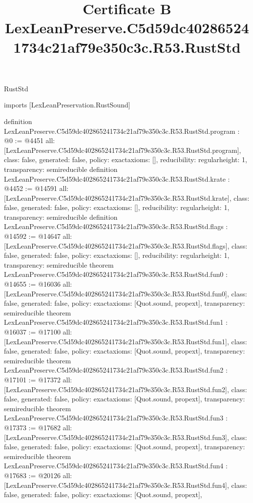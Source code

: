 \begin{lexlean}{RustStd}
\title{Certificate B LexLeanPreserve.C5d59dc402865241734c21af79e350c3c.R53.RustStd}
\begin{coremodule}
imports [LexLeanPreservation.RustSound]

definition LexLeanPreserve.C5d59dc402865241734c21af79e350c3c.R53.RustStd.program : @0 := @4451 {
  all: [LexLeanPreserve.C5d59dc402865241734c21af79e350c3c.R53.RustStd.program],
  class: false,
  generated: false,
  policy: exact{axioms: []},
  reducibility: regular{height: 1},
  transparency: semireducible
}
definition LexLeanPreserve.C5d59dc402865241734c21af79e350c3c.R53.RustStd.krate : @4452 := @14591 {
  all: [LexLeanPreserve.C5d59dc402865241734c21af79e350c3c.R53.RustStd.krate],
  class: false,
  generated: false,
  policy: exact{axioms: []},
  reducibility: regular{height: 1},
  transparency: semireducible
}
definition LexLeanPreserve.C5d59dc402865241734c21af79e350c3c.R53.RustStd.flags : @14592 := @14647 {
  all: [LexLeanPreserve.C5d59dc402865241734c21af79e350c3c.R53.RustStd.flags],
  class: false,
  generated: false,
  policy: exact{axioms: []},
  reducibility: regular{height: 1},
  transparency: semireducible
}
theorem LexLeanPreserve.C5d59dc402865241734c21af79e350c3c.R53.RustStd.fun0 : @14655 := @16036 {
  all: [LexLeanPreserve.C5d59dc402865241734c21af79e350c3c.R53.RustStd.fun0],
  class: false,
  generated: false,
  policy: exact{axioms: [Quot.sound, propext]},
  transparency: semireducible
}
theorem LexLeanPreserve.C5d59dc402865241734c21af79e350c3c.R53.RustStd.fun1 : @16037 := @17100 {
  all: [LexLeanPreserve.C5d59dc402865241734c21af79e350c3c.R53.RustStd.fun1],
  class: false,
  generated: false,
  policy: exact{axioms: [Quot.sound, propext]},
  transparency: semireducible
}
theorem LexLeanPreserve.C5d59dc402865241734c21af79e350c3c.R53.RustStd.fun2 : @17101 := @17372 {
  all: [LexLeanPreserve.C5d59dc402865241734c21af79e350c3c.R53.RustStd.fun2],
  class: false,
  generated: false,
  policy: exact{axioms: [Quot.sound, propext]},
  transparency: semireducible
}
theorem LexLeanPreserve.C5d59dc402865241734c21af79e350c3c.R53.RustStd.fun3 : @17373 := @17682 {
  all: [LexLeanPreserve.C5d59dc402865241734c21af79e350c3c.R53.RustStd.fun3],
  class: false,
  generated: false,
  policy: exact{axioms: [Quot.sound, propext]},
  transparency: semireducible
}
theorem LexLeanPreserve.C5d59dc402865241734c21af79e350c3c.R53.RustStd.fun4 : @17683 := @20126 {
  all: [LexLeanPreserve.C5d59dc402865241734c21af79e350c3c.R53.RustStd.fun4],
  class: false,
  generated: false,
  policy: exact{axioms: [Quot.sound, propext]},
}
\end{coremodule}
\end{lexlean}
